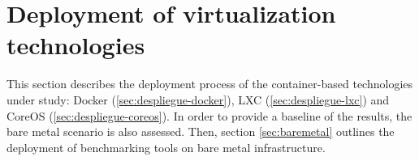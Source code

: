 \section{\label{sec:intro-despliegue}Deployment of virtualization technologies}

This section describes the deployment process of the container-based technologies under study: Docker (\ref{sec:despliegue-docker}), LXC (\ref{sec:despliegue-lxc}) and CoreOS (\ref{sec:despliegue-coreos}). 
In order to provide a baseline of the results, the bare metal scenario is also assessed. 
Then, section \ref{sec:baremetal} outlines the deployment of benchmarking tools on bare metal infrastructure.
